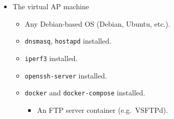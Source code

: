 \begin{itemize}
\tightlist
\item
  The virtual AP machine

  \begin{itemize}
  \tightlist
  \item
    Any Debian-based OS (Debian, Ubuntu, etc.).
  \item
    \texttt{dnsmasq}, \texttt{hostapd} installed.
  \item
    \texttt{iperf3} installed.
  \item
    \texttt{openssh-server} installed.
  \item
    \texttt{docker} and \texttt{docker-compose} installed.

    \begin{itemize}
    \tightlist
    \item
      An FTP server container (e.g.~VSFTPd).
    \end{itemize}
  \end{itemize}
\end{itemize}
